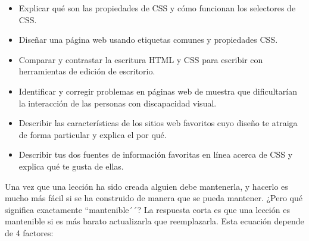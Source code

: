 \begin{itemize}
 
\item
  Explicar qué son las propiedades de CSS y cómo funcionan los selectores de CSS.
 
\item
  Diseñar una página web usando etiquetas comunes y propiedades CSS.
 
\item
 Comparar y contrastar la escritura HTML y CSS
para escribir con herramientas de edición de escritorio.
  
\item
  Identificar y corregir problemas en páginas web de muestra
  que dificultarían la interacción de las personas con discapacidad visual.
 
\item
Describir las características de los sitios web favoritos
cuyo diseño te atraiga de forma particular
y explica el por qué.
 
\item
  Describir tus dos fuentes de información favoritas en línea acerca
de CSS y explica qué te gusta de ellas.
 
\end{itemize}
 
 
Una vez que una lección ha sido creada alguien debe mantenerla,
y hacerlo es mucho más fácil si se ha construido de manera que se pueda mantener.
¿Pero qué significa exactamente ``mantenible´´? 
La respuesta corta es que una lección es mantenible
si es más barato actualizarla que reemplazarla.
Esta ecuación depende de 4 factores:
 
